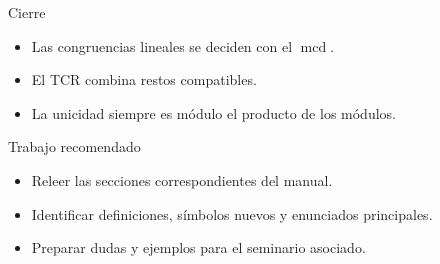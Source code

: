 \documentclass[aspectratio=169,11pt]{beamer}
\newcommand{\mcd}{\operatorname{mcd}}
\begin{document}
\begin{frame}{Cierre}
\begin{itemize}
  \item Las congruencias lineales se deciden con el \(\mcd\).
  \item El TCR combina restos compatibles.
  \item La unicidad siempre es módulo el producto de los módulos.
\end{itemize}
\end{frame}

\begin{frame}{Trabajo recomendado}
\begin{itemize}
  \item Releer las secciones correspondientes del manual.
  \item Identificar definiciones, símbolos nuevos y enunciados principales.
  \item Preparar dudas y ejemplos para el seminario asociado.
\end{itemize}
\end{frame}
\end{document}
